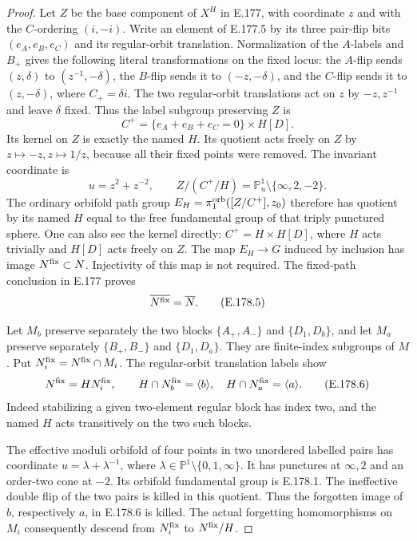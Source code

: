\begin{proof}
Let \(Z\) be the base component of \(X^H\) in E.177,
with coordinate \(z\) and with the \(C\)-ordering \((i,-i)\).
Write an element of E.177.5 by its three pair-flip bits
\((e_A,e_B,e_C)\) and its regular-orbit translation.
Normalization of the \(A\)-labels and \(B_+\) gives
the following literal transformations on the fixed locus:
the \(A\)-flip sends \((z,\delta)\) to \((z^{-1},-\delta)\),
the \(B\)-flip sends it to \((-z,-\delta)\), and the
\(C\)-flip sends it to \((z,-\delta)\), where
\(C_+=\delta i\).  The two regular-orbit translations
act on \(z\) by \(-z,z^{-1}\) and leave \(\delta\) fixed.
Thus the label subgroup preserving \(Z\) is
\[
 C^+=\{e_A+e_B+e_C=0\}\times H[D].
\tag{E.178.3}
\]
Its kernel on \(Z\) is exactly the named \(H\).
Its quotient acts freely on \(Z\) by
\(z\mapsto-z,z\mapsto1/z\), because all their fixed
points were removed.  The invariant coordinate is
\[
                 u=z^2+z^{-2},\qquad
 Z/(C^+/H)=\mathbb P^1_u\setminus\{\infty,2,-2\}.
\tag{E.178.4}
\]
The ordinary orbifold path group
\(E_H=\pi_1^{\rm orb}([Z/C^+],z_0)\) therefore has
quotient by its named \(H\) equal to the free
fundamental group of that triply punctured sphere.
One can also see the kernel directly:
\(C^+=H\times H[D]\), where \(H\) acts trivially
and \(H[D]\) acts freely on \(Z\).
The map \(E_H\to G\) induced by inclusion has image
\(N^{\rm fix}\subset N\).  Injectivity of this map
is not required.  The fixed-path conclusion in
E.177 proves
\[
                         \overline{N^{\rm fix}}=\overline N .
\tag{E.178.5}
\]

Let \(M_b\) preserve separately the two blocks
\(\{A_+,A_-\}\) and \(\{D_1,D_b\}\), and let \(M_a\)
preserve separately \(\{B_+,B_-\}\) and \(\{D_1,D_a\}\).
They are finite-index subgroups of \(M\).
Put \(N_i^{\rm fix}=N^{\rm fix}\cap M_i\).
The regular-orbit translation labels show
\[
 N^{\rm fix}=H N_i^{\rm fix},\qquad
 H\cap N_b^{\rm fix}=\langle b\rangle,\quad
 H\cap N_a^{\rm fix}=\langle a\rangle.
\tag{E.178.6}
\]
Indeed stabilizing a given two-element regular block
has index two, and the named \(H\) acts transitively
on the two such blocks.

The effective moduli orbifold of four points in two
unordered labelled pairs has coordinate
\(u=\lambda+\lambda^{-1}\), where
\(\lambda\in\mathbb P^1\setminus\{0,1,\infty\}\).
It has punctures at \(\infty,2\) and an order-two
cone at \(-2\).  Its orbifold fundamental group is
E.178.1.  The ineffective double flip of the two
pairs is killed in this quotient.  Thus the
forgotten image of \(b\), respectively \(a\), in
E.178.6 is killed.  The actual forgetting
homomorphisms on \(M_i\) consequently descend from
\(N_i^{\rm fix}\) to \(N^{\rm fix}/H\).


\end{proof}
